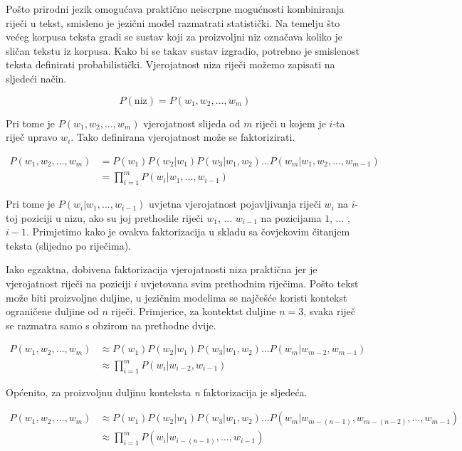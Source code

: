\documentclass[times, utf8, diplomski, numeric]{fer}
\begin{document}
Pošto prirodni jezik omogućava praktično neiscrpne mogućnosti kombiniranja riječi u tekst, smisleno je jezični model razmatrati statistički. Na temelju što većeg korpusa teksta gradi se sustav koji za proizvoljni niz označava koliko je sličan tekstu iz korpusa. Kako bi se takav sustav izgradio, potrebno je smislenost teksta definirati probabilistički. Vjerojatnost niza riječi možemo zapisati na sljedeći način.

\[
P(\text{niz}) = P(w_1, w_2, ... , w_m)
\]

Pri tome je $P(w_1, w_2, ... , w_m)$ vjerojatnost slijeda od $m$ riječi u kojem je $i$-ta riječ upravo $w_i$. Tako definirana vjerojatnost može se faktorizirati.

\begin{align*}
P(w_1, w_2, ... , w_m)
  &= P(w_1) P(w_2 | w_1) P(w_3 | w_1, w_2) ... P(w_m | w_1, w_2, ... , w_{m - 1 }) \\
  &= \prod_{i = 1}^m{P(w_i|w_1, ... , w_{i - 1})}
\end{align*}

Pri tome je $P(w_i | w_1, ... , w_{i - 1})$ uvjetna vjerojatnost pojavljivanja riječi $w_i$ na $i$-toj poziciji u nizu, ako su joj prethodile riječi $w_1$, ... $w_{i - 1}$ na pozicijama $1$, ... , $i - 1$. Primjetimo kako je ovakva faktorizacija u skladu sa čovjekovim čitanjem teksta (slijedno po riječima).

Iako egzaktna, dobivena faktorizacija vjerojatnosti niza praktična jer je vjerojatnost riječi na poziciji $i$ uvjetovana svim prethodnim riječima. Pošto tekst može biti proizvoljne duljine, u jezičnim modelima se najčešće koristi kontekst ograničene duljine od $n$ riječi. Primjerice, za kontektst duljine $n = 3$, svaka riječ se razmatra samo s obzirom na prethodne dvije.

\begin{align*}
P(w_1, w_2, ... , w_m)
  &\approx P(w_1) P(w_2 | w_1) P(w_3 | w_1, w_2)  ... P(w_m | w_{m - 2}, w_{m - 1}) \\
  &\approx \prod_{i = 1}^m{P(w_i | w_{i - 2}, w_{i - 1})}
\end{align*}

Općenito, za proizvoljnu duljinu konteksta \textit{n} faktorizacija je sljedeća.

\begin{align*}
P(w_1, w_2, ... , w_m)
  &\approx P(w_1) P(w_2 | w_1) P(w_3 | w_1, w_2)  ... P(w_m | w_{m - (n - 1)}, w_{m - (n - 2)}, ... , w_{m - 1}) \\
  &\approx \prod_{i = 1}^m{P(w_i | w_{i - (n - 1)}, ... , w_{i - 1})}
\end{align*}
\end{document}
